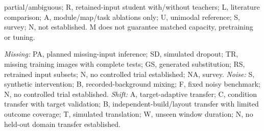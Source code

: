 partial/ambiguous; R, retained-input student with/without teachers; L, literature
comparison; A, module/map/task ablations only; U, unimodal reference; S, survey; N, not
established. M does not guarantee matched capacity, pretraining or tuning.
\par\noindent\textit{Missing:} PA, planned missing-input inference; SD, simulated
dropout; TR, missing training images with complete tests; GS, generated substitution;
RS, retrained input subsets; N, no controlled trial established; NA, survey.
\textit{Noise:} S, synthetic intervention; B, recorded-background mixing; F, fixed noisy
benchmark; N, no controlled trial established. \textit{Shift:} A, target-adaptive
transfer; C, condition transfer with target validation; B, independent-build/layout
transfer with limited outcome coverage; T, simulated translation; W, unseen window
duration; N, no held-out domain transfer established.
